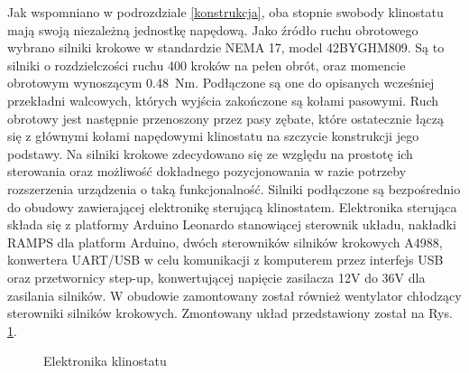 Jak wspomniano w podrozdziale \ref{konstrukcja}, oba stopnie swobody klinostatu mają swoją niezależną jednostkę napędową. Jako źródło ruchu obrotowego wybrano silniki krokowe w standardzie NEMA 17, model 42BYGHM809. Są to silniki o rozdzielczości ruchu 400 kroków na pełen obrót, oraz momencie obrotowym wynoszącym \SI{0,48}{Nm}. Podłączone są one do opisanych wcześniej przekładni walcowych, których wyjścia zakończone są kołami pasowymi. Ruch obrotowy jest następnie przenoszony przez pasy zębate, które ostatecznie łączą się z głównymi kołami napędowymi klinostatu na szczycie konstrukcji jego podstawy. Na silniki krokowe zdecydowano się ze względu na prostotę ich sterowania oraz możliwość dokładnego pozycjonowania w razie potrzeby rozszerzenia urządzenia o taką funkcjonalność. Silniki podłączone są bezpośrednio do obudowy zawierającej elektronikę sterującą klinostatem. Elektronika sterująca składa się z platformy Arduino Leonardo stanowiącej sterownik układu, nakładki RAMPS dla platform Arduino, dwóch sterowników silników krokowych A4988, konwertera UART/USB w celu komunikacji z komputerem przez interfejs USB oraz przetwornicy step-up, konwertującej napięcie zasilacza 12V do 36V dla zasilania silników. W obudowie zamontowany został również wentylator chłodzący sterowniki silników krokowych. Zmontowany układ przedstawiony został na Rys. \ref{fig:elektronika}.

\begin{figure}[ht]
	\centering
	\setlength{\fboxsep}{0pt}
	\setlength{\fboxrule}{1pt}
	\caption{Elektronika klinostatu} 
	\label{fig:elektronika}
\end{figure}